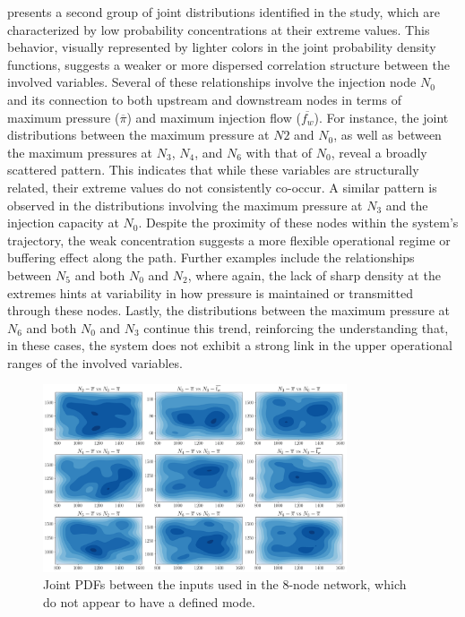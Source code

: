  presents a second group of joint distributions identified in the study, which are characterized by low probability concentrations at their extreme values. This behavior, visually represented by lighter colors in the joint probability density functions, suggests a weaker or more dispersed correlation structure between the involved variables. Several of these relationships involve the injection node $N_0$ and its connection to both upstream and downstream nodes in terms of maximum pressure ($\overline{\pi}$) and maximum injection flow ($\overline{f_w}$). For instance, the joint distributions between the maximum pressure at $N2$ and $N_0$, as well as between the maximum pressures at $N_3$, $N_4$, and $N_6$ with that of $N_0$, reveal a broadly scattered pattern. This indicates that while these variables are structurally related, their extreme values do not consistently co-occur. A similar pattern is observed in the distributions involving the maximum pressure at $N_3$ and the injection capacity at $N_0$. Despite the proximity of these nodes within the system’s trajectory, the weak concentration suggests a more flexible operational regime or buffering effect along the path. Further examples include the relationships between $N_5$ and both $N_0$ and $N_2$, where again, the lack of sharp density at the extremes hints at variability in how pressure is maintained or transmitted through these nodes. Lastly, the distributions between the maximum pressure at $N_6$ and both $N_0$ and $N_3$ continue this trend, reinforcing the understanding that, in these cases, the system does not exhibit a strong link in the upper operational ranges of the involved variables.


\begin{figure}[h]
    \begin{center}
        \includegraphics[width=0.8\textwidth]{figures/Chapter_NonLinealCensnet/PDF_inputs_inputs_no_mode.png}
    \end{center}
    \caption{Joint PDFs between the inputs used in the 8-node network, which do not appear to have a defined mode. }
    \label{fig:joint_distributions_input_input_no_mode}
\end{figure}



